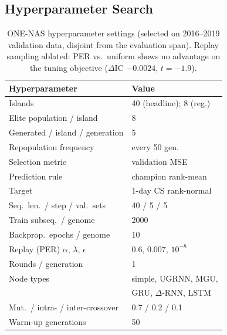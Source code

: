
\subsection{Hyperparameter Search}

\begin{table}[t]
\centering
\footnotesize
\begin{tabular}{@{}l@{\hspace{4pt}}l@{}}
\toprule
Hyperparameter & Value \\
\midrule
Islands & 40 (headline); 8 (reg.) \\
Elite population / island & 8 \\
Generated / island / generation & 5 \\
Repopulation frequency & every 50 gen. \\
Selection metric & validation MSE \\
Prediction rule & champion rank-mean \\
Target & 1-day CS rank-normal \\
Seq.\ len.\ / step / val.\ sets & 40 / 5 / 5 \\
Train subseq.\ / genome & 2000 \\
Backprop.\ epochs / genome & 10 \\
Replay (PER) $\alpha$, $\lambda$, $\epsilon$ & 0.6, 0.007, $10^{-8}$ \\
Rounds / generation & 1 \\
Node types & simple, UGRNN, MGU, \\
 & GRU, $\Delta$-RNN, LSTM \\
Mut.\ / intra- / inter-crossover & 0.7 / 0.2 / 0.1 \\
Warm-up generations & 50 \\
\bottomrule
\end{tabular}
\caption{ONE-NAS hyperparameter settings (selected on 2016--2019
validation data, disjoint from the evaluation span). Replay sampling
ablated: PER vs.\ uniform shows no advantage on the tuning objective
($\Delta$IC $-0.0024$, $t{=}-1.9$).}
\label{tab:hps}
\end{table}

